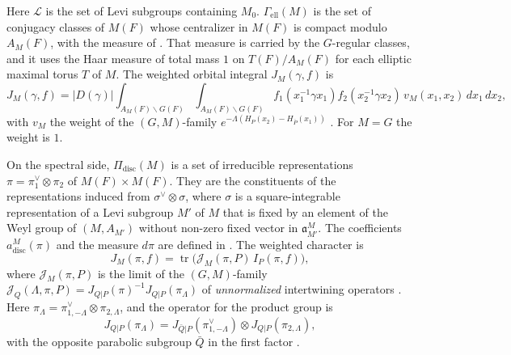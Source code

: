 \documentclass[12pt,letterpaper]{article}
\numberwithin{equation}{section}
\theoremstyle{plain}
\theoremstyle{definition}
\theoremstyle{remark}
\newcommand{\cL}{\mathcal{L}}
\newcommand{\fa}{\mathfrak{a}}
\DeclareMathOperator{\tr}{tr}
\newcommand{\ellr}{\mathrm{ell}}
\begin{document}
Here $\cL$ is the set of Levi subgroups containing $M_0$. $\Gamma_{\ellr}(M)$ is the set of conjugacy classes of $M(F)$ whose centralizer in $M(F)$ is compact modulo $A_M(F)$, with the measure of \cite[\S2]{Ar91}. That measure is carried by the $G$-regular classes, and it uses the Haar measure of total mass $1$ on $T(F)/A_M(F)$ for each elliptic maximal torus $T$ of $M$. The weighted orbital integral $J_M(\gamma,f)$ is
\[
J_M(\gamma,f)=|D(\gamma)|\int_{A_M(F)\backslash G(F)}\int_{A_M(F)\backslash G(F)}f_1(x_1^{-1}\gamma x_1)f_2(x_2^{-1}\gamma x_2)\,v_M(x_1,x_2)\,dx_1\,dx_2,
\]
with $v_M$ the weight of the $(G,M)$-family $e^{-\Lambda(H_P(x_2)-H_{\bar P}(x_1))}$ \cite[(12.1), (12.2)]{Ar91}. For $M=G$ the weight is $1$.

On the spectral side, $\Pi_{\mathrm{disc}}(M)$ is a set of irreducible representations $\pi=\pi_1^\vee\otimes\pi_2$ of $M(F)\times M(F)$. They are the constituents of the representations induced from $\sigma^\vee\otimes\sigma$, where $\sigma$ is a square-integrable representation of a Levi subgroup $M'$ of $M$ that is fixed by an element of the Weyl group of $(M,A_{M'})$ without non-zero fixed vector in $\fa_{M'}^M$. The coefficients $a^M_{\mathrm{disc}}(\pi)$ and the measure $d\pi$ are defined in \cite[(12.4)--(12.6)]{Ar91}. The weighted character is
\[
J_M(\pi,f)=\tr\big(\mathcal J_M(\pi,P)\,I_P(\pi,f)\big),
\]
where $\mathcal J_M(\pi,P)$ is the limit of the $(G,M)$-family $\mathcal J_Q(\Lambda,\pi,P)=J_{Q|P}(\pi)^{-1}J_{Q|P}(\pi_\Lambda)$ of \emph{unnormalized} intertwining operators \cite[(12.7), (12.8)]{Ar91}. Here $\pi_\Lambda=\pi^\vee_{1,-\Lambda}\otimes\pi_{2,\Lambda}$, and the operator for the product group is
\begin{equation}\label{e:JQP}
J_{Q|P}(\pi_\Lambda)=J_{\bar Q|P}(\pi^\vee_{1,-\Lambda})\otimes J_{Q|P}(\pi_{2,\Lambda}),
\end{equation}
with the opposite parabolic subgroup $\bar Q$ in the first factor \cite[p.~90]{Ar91}.
\end{document}
